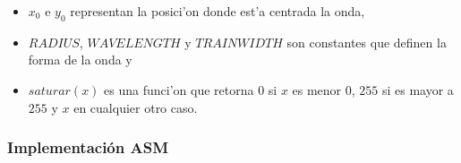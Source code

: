 \begin{itemize}
  \item $x_0$ e $y_0$ representan la posici'on donde est'a centrada la onda,
  \item $RADIUS$, $WAVELENGTH$ y $TRAINWIDTH$ son constantes que definen la 
  forma de la onda y
  \item $saturar(x)$ es una funci'on que retorna $0$ si $x$ es menor $0$, $255$
  si es mayor a $255$ y $x$ en cualquier otro caso.
\end{itemize}

\subsubsection{Implementación ASM}